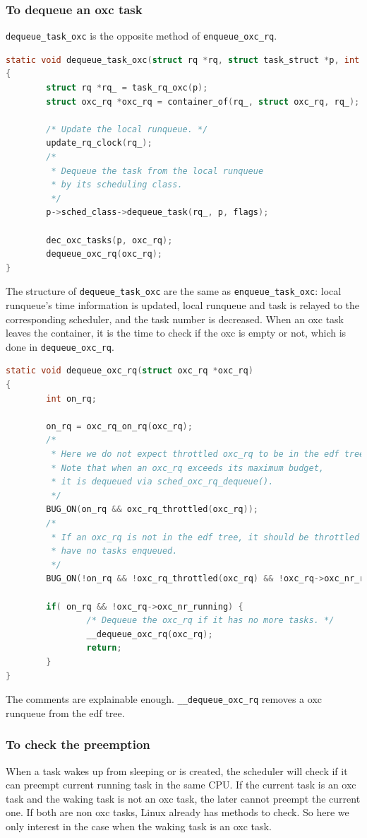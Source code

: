 \subsubsection{To dequeue an oxc task}
\texttt{dequeue\_task\_oxc} is the opposite method of 
\texttt{enqueue\_oxc\_rq}.
\begin{lstlisting}[language=C]
static void dequeue_task_oxc(struct rq *rq, struct task_struct *p, int flags)
{
        struct rq *rq_ = task_rq_oxc(p);
        struct oxc_rq *oxc_rq = container_of(rq_, struct oxc_rq, rq_);

        /* Update the local runqueue. */
        update_rq_clock(rq_);
        /*
         * Dequeue the task from the local runqueue 
         * by its scheduling class.
         */
        p->sched_class->dequeue_task(rq_, p, flags);

        dec_oxc_tasks(p, oxc_rq);
        dequeue_oxc_rq(oxc_rq);
}
\end{lstlisting}
The structure of \texttt{dequeue\_task\_oxc} are the same as 
\texttt{enqueue\_task\_oxc}: local runqueue's time information is updated,
local runqueue and task is relayed to the corresponding scheduler, 
and the task number is decreased. When an oxc task leaves the container,
it is the time to check if the oxc is empty or not, which is done in
\texttt{dequeue\_oxc\_rq}.
\begin{lstlisting}[language=C]
static void dequeue_oxc_rq(struct oxc_rq *oxc_rq)
{
        int on_rq;

        on_rq = oxc_rq_on_rq(oxc_rq);
        /*
         * Here we do not expect throttled oxc_rq to be in the edf tree.
         * Note that when an oxc_rq exceeds its maximum budget,
         * it is dequeued via sched_oxc_rq_dequeue().
         */
        BUG_ON(on_rq && oxc_rq_throttled(oxc_rq));
        /* 
         * If an oxc_rq is not in the edf tree, it should be throttled or 
         * have no tasks enqueued.
         */
        BUG_ON(!on_rq && !oxc_rq_throttled(oxc_rq) && !oxc_rq->oxc_nr_running);

        if( on_rq && !oxc_rq->oxc_nr_running) {
                /* Dequeue the oxc_rq if it has no more tasks. */
                __dequeue_oxc_rq(oxc_rq);
                return;
        }
}
\end{lstlisting}
The comments are explainable enough. \texttt{\_\_dequeue\_oxc\_rq} removes 
a oxc runqueue from the edf tree.

\subsubsection{To check the preemption}
When a task wakes up from sleeping or is created, the scheduler will check 
if it can preempt current running task in the same CPU. If the current task
is an oxc task and the waking task is not an oxc task, the later cannot
preempt the current one. If both are non oxc tasks, Linux already has methods
to check. So here we only interest in the case when the waking task is an
oxc task.\\

